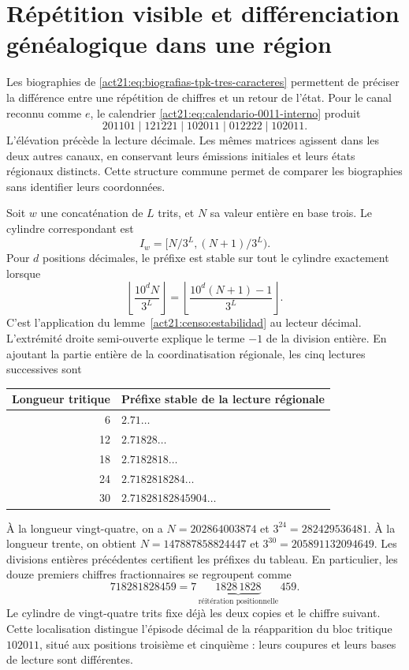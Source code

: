 \section{Répétition visible et différenciation généalogique dans une région}
\label{md:ejemplo:region}
Les biographies de \eqref{act21:eq:biografias-tpk-tres-caracteres}
permettent de préciser la différence entre une répétition de chiffres et un
retour de l’état. Pour le canal reconnu comme \(e\), le
calendrier \eqref{act21:eq:calendario-0011-interno} produit
\[
 201101\mid121221\mid102011\mid012222\mid102011.
\]
L’élévation précède la lecture décimale. Les mêmes matrices agissent
dans les deux autres canaux, en conservant leurs émissions initiales et leurs
états régionaux distincts. Cette structure commune permet de comparer
les biographies sans identifier leurs coordonnées.

Soit \(w\) une concaténation de \(L\) trits, et \(N\) sa valeur entière
en base trois. Le cylindre correspondant est
\[
 I_w=[N/3^L,(N+1)/3^L).
\]
Pour \(d\) positions décimales, le préfixe est stable sur tout le
cylindre exactement lorsque
\[
 \left\lfloor\frac{10^dN}{3^L}\right\rfloor
 =\left\lfloor\frac{10^d(N+1)-1}{3^L}\right\rfloor.
\]
C’est l’application du lemme~\ref{act21:censo:estabilidad} au lecteur
décimal. L’extrémité droite semi-ouverte explique le terme \(-1\)
de la division entière. En ajoutant la partie entière de la coordinatisation régionale,
les cinq lectures successives sont
\begin{center}
\begin{tabular}{@{}rl@{}}
\toprule
Longueur tritique & Préfixe stable de la lecture régionale\\
\midrule
6 & \(2.71\ldots\)\\
12 & \(2.71828\ldots\)\\
18 & \(2.7182818\ldots\)\\
24 & \(2.7182818284\ldots\)\\
30 & \(2.71828182845904\ldots\)\\
\bottomrule
\end{tabular}
\end{center}
À la longueur vingt-quatre, on a
\(N=202864003874\) et \(3^{24}=282429536481\).
À la longueur trente, on obtient
\(N=147887858824447\) et \(3^{30}=205891132094649\).
Les divisions entières précédentes certifient les préfixes du tableau.
En particulier, les douze premiers chiffres fractionnaires se regroupent comme
\[
 718281828459
 =7\,\underbrace{1828\,1828}_{\text{réitération positionnelle}}\,459.
\]
Le cylindre de vingt-quatre trits fixe déjà les deux copies et le chiffre
suivant. Cette localisation distingue l’épisode décimal de la
réapparition du bloc tritique \(102011\), situé aux positions
troisième et cinquième : leurs coupures et leurs bases de lecture sont différentes.


